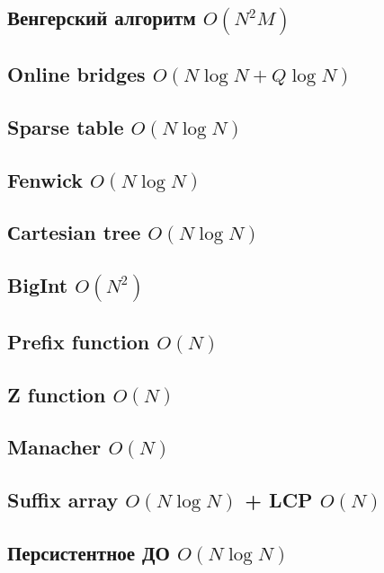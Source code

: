 \documentclass[10pt]{article}
\begin{document}
\begin{multicols}{2}
\subsection{Венгерский алгоритм $O(N^2M)$}

\subsection{Online bridges $O(N\log{N} + Q\log{N})$}

\subsection{Sparse table $O(N\log{N})$}

\subsection{Fenwick $O(N\log{N})$}

\subsection{Сartesian tree $O(N\log{N})$}

\subsection{BigInt $O(N^2)$}

\subsection{Prefix function $O(N)$}

\subsection{Z function $O(N)$}

\subsection{Manacher $O(N)$}

\subsection{Suffix array $O(N\log{N})$ + LCP $O(N)$}

\subsection{Персистентное ДО $O(N\log{N})$}


\end{multicols}
\end{document}
